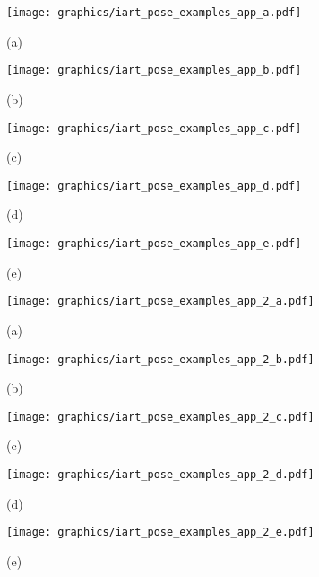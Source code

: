 \documentclass[sigconf]{acmart}
\begin{document}
\captionsetup[subfigure]{labelformat=empty}
\begin{figure*}[hp]
\begin{center}

\centering
\begin{subfigure}{.09\linewidth}
  \centering
  \texttt{[image: graphics/iart\_pose\_examples\_app\_a.pdf]}
  \caption{(a)}
  \label{fig:examples-gt}
\end{subfigure}\hfill
\begin{subfigure}{.09\linewidth}
  \centering
  \texttt{[image: graphics/iart\_pose\_examples\_app\_b.pdf]}
  \caption{(b)}
  \label{fig:examples-openpose}
\end{subfigure}\hfill
\begin{subfigure}{.09\linewidth}
  \centering
  \texttt{[image: graphics/iart\_pose\_examples\_app\_c.pdf]}
  \caption{(c)}
  \label{fig:examples-coco}
\end{subfigure}\hfill
\begin{subfigure}{.09\linewidth}
  \centering
  \texttt{[image: graphics/iart\_pose\_examples\_app\_d.pdf]}
  \caption{(d)}
  \label{fig:examples-our}
\end{subfigure}\hfill
\begin{subfigure}{.09\linewidth}
  \centering
  \texttt{[image: graphics/iart\_pose\_examples\_app\_e.pdf]}
  \caption{(e)}
  \label{fig:examples-our}
\end{subfigure}\hspace{17.5pt}
\hfill
\hspace{17.5pt}
\begin{subfigure}{.09\linewidth}
  \centering
  \texttt{[image: graphics/iart\_pose\_examples\_app\_2\_a.pdf]}
  \caption{(a)}
  \label{fig:examples-gt}
\end{subfigure}\hfill
\begin{subfigure}{.09\linewidth}
  \centering
  \texttt{[image: graphics/iart\_pose\_examples\_app\_2\_b.pdf]}
  \caption{(b)}
  \label{fig:examples-openpose}
\end{subfigure}\hfill
\begin{subfigure}{.09\linewidth}
  \centering
  \texttt{[image: graphics/iart\_pose\_examples\_app\_2\_c.pdf]}
  \caption{(c)}
  \label{fig:examples-coco}
\end{subfigure}\hfill
\begin{subfigure}{.09\linewidth}
  \centering
  \texttt{[image: graphics/iart\_pose\_examples\_app\_2\_d.pdf]}
  \caption{(d)}
  \label{fig:examples-our}
\end{subfigure}\hfill
\begin{subfigure}{.09\linewidth}
  \centering
  \texttt{[image: graphics/iart\_pose\_examples\_app\_2\_e.pdf]}
  \caption{(e)}
  \label{fig:examples-our}
\end{subfigure}\end{center}


\end{figure*}
\end{document}
